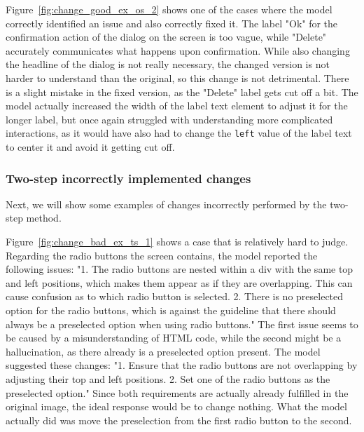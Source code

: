 \documentclass[11pt,titlepage,oneside,openany]{book}
\begin{document}
Figure~\ref{fig:change_good_ex_os_2} shows one of the cases where the model correctly identified an issue and also correctly fixed it. The label "Ok" for the confirmation action of the dialog on the screen is too vague, while "Delete" accurately communicates what happens upon confirmation. While also changing the headline of the dialog is not really necessary, the changed version is not harder to understand than the original, so this change is not detrimental. There is a slight mistake in the fixed version, as the "Delete" label gets cut off a bit. The model actually increased the width of the label text element to adjust it for the longer label, but once again struggled with understanding more complicated interactions, as it would have also had to change the \texttt{left} value of the label text to center it and avoid it getting cut off.

\subsubsection{Two-step incorrectly implemented changes}

Next, we will show some examples of changes incorrectly performed by the two-step method.

Figure~\ref{fig:change_bad_ex_ts_1} shows a case that is relatively hard to judge. Regarding the radio buttons the screen contains, the model reported the following issues: "1. The radio buttons are nested within a div with the same top and left positions, which makes them appear as if they are overlapping. This can cause confusion as to which radio button is selected. 2. There is no preselected option for the radio buttons, which is against the guideline that there should always be a preselected option when using radio buttons." The first issue seems to be caused by a misunderstanding of HTML code, while the second might be a hallucination, as there already is a preselected option present. The model suggested these changes: "1. Ensure that the radio buttons are not overlapping by adjusting their top and left positions. 2. Set one of the radio buttons as the preselected option." Since both requirements are actually already fulfilled in the original image, the ideal response would be to change nothing. What the model actually did was move the preselection from the first radio button to the second.
\end{document}
